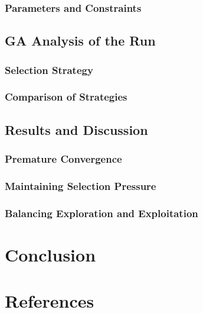 \documentclass[conference]{inc/IEEEtran}
\begin{document}
\subsubsection{Parameters and Constraints}
\subsection{GA Analysis of the Run}

\subsubsection{Selection Strategy}

\subsubsection{Comparison of Strategies}
\subsection{Results and Discussion}

\subsubsection{Premature Convergence}

\subsubsection{Maintaining Selection Pressure}

\subsubsection{Balancing Exploration and Exploitation}

\section{Conclusion}

\section*{References}




\end{document}
